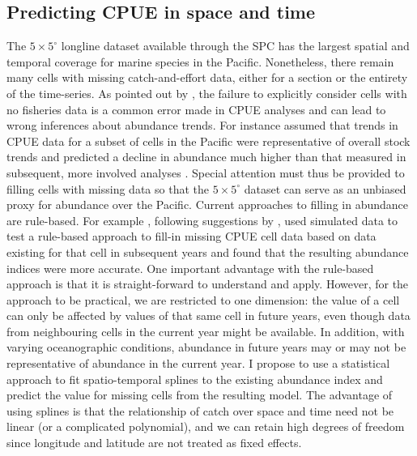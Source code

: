 \documentclass{article}
\newcommand{\griddef}[2]{$#1 \times #2^\circ$}
\begin{document}
\subsection{Predicting CPUE in space and time}
The \griddef{5}{5} longline dataset available through the SPC
has the largest spatial and temporal coverage for marine
species in the Pacific. Nonetheless, there remain many cells with missing
catch-and-effort data, either for a section or the entirety of the
time-series. As pointed out by \citet{Walters2003_a}, the
failure to explicitly consider cells with no fisheries data is a
common error made in CPUE analyses and can lead to wrong inferences
about abundance trends. For instance \citet{Myers2003_a} assumed that
trends in CPUE data for a subset of cells in the Pacific were
representative of overall stock trends and predicted a decline in abundance much
higher than that measured in subsequent, more involved analyses
\citep{Sibert2006_a}. Special attention must thus be provided to
filling cells with missing data so that the \griddef{5}{5} dataset can serve
as an unbiased proxy for abundance over the Pacific. Current
approaches to filling in abundance are rule-based. For example
\citet{Carruthers2011_a}, following suggestions by
\citet{Walters2003_a}, used simulated data to test a rule-based
approach to fill-in missing CPUE cell data based on data
existing for that cell in subsequent years and found that the
resulting abundance indices were more accurate. One important advantage with
the rule-based approach is that it is straight-forward to understand and
apply. However, for the approach to be
practical, we are restricted to one dimension: the value of a cell can
only be affected by values of that same cell in future years, even
though data from neighbouring cells in the current year might be
available. In addition, with varying oceanographic conditions, abundance in future
years may or may not be representative of abundance in the current
year. I propose to use a statistical approach to fit spatio-temporal
splines to the existing abundance index and predict the value for
missing cells from the resulting model. The advantage of using splines
is that the relationship of catch over space and time need not be
linear (or a complicated polynomial), and we can retain high degrees
of freedom since longitude and latitude are not treated as fixed
effects. %
\end{document}
